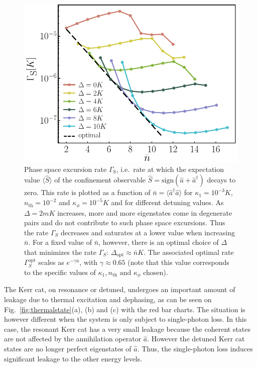 \documentclass[%
 reprint,
 superscriptaddress,
 amsmath,
 amssymb,
 aps,
 pra,
 10pt
]{revtex4-2}
\newcommand{\ie}{i.e.}
\newcommand{\nbar}{\bar{n}}
\newcommand{\adag}{\hat{a}^\dagger}
\newcommand{\hata}{\hat{a}}
\begin{document}
\begin{figure}[t!]
    \centering
    \includegraphics[width=\columnwidth]{image/Bitflip_V2.pdf}
    \vspace{-0.5cm}
    \caption{\label{fig:bitflip}
         Phase space excursion rate $\Gamma_\text{S}$, \ie~rate at which the expectation value $\langle \hat S \rangle$ of the confinement observable $\hat S=\textrm{sign}(\hata+\adag)$ decays to zero. This rate is plotted as a function of $\bar{n} = \langle\adag \hata\rangle$ for $\kappa_1 = 10^{-3}K$, $n_{\text{th}}=10^{-2}$ and $\kappa_\phi = 10^{-5}K$ and  for different detuning values. As $\Delta=2mK$ increases, more and more eigenstates come in degenerate pairs and do not contribute to such phase space excursions. Thus the rate $\Gamma_S$ decreases and saturates at a lower value when increasing $\bar n$. For a fixed value of $\bar n$, however, there is an optimal choice of $\Delta$ that minimizes the rate $\Gamma_S$: $\Delta_{\text{opt}} \approx \nbar K$. The associated optimal rate $\Gamma^{\text{opt}}_S$ scales as $e^{-\gamma\bar n}$, with $\gamma\approx 0.65$ (note that this value corresponds to the specific values of $\kappa_1,n_{\text{th}} \text{ and } \kappa_\phi$ chosen).
    }
\end{figure}

The Kerr cat, on resonance or detuned, undergoes an important amount of leakage due to thermal excitation and dephasing, as can be seen on Fig.~\ref{fig:thermalstate}(a), (b) and (c) with the red bar charts. The situation is however different when the system is only subject to  single-photon loss. In this case, the resonant Kerr cat has a very small leakage because the coherent states are not affected by the annihilation operator $\hata$. However the detuned Kerr cat states are no longer perfect eigenstates of  $\hata$. Thus, the single-photon loss induces significant leakage to the other energy levels. 
\end{document}
